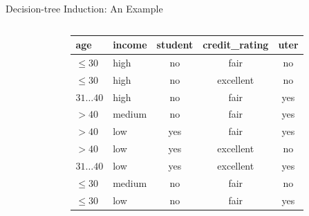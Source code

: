 \begin{frame}{Decision-tree Induction: An Example}
\begin{columns}
\begin{column}{0.4\textwidth}
\begin{itemize}
      \end{itemize}
    \end{column}
    \begin{column}{0.6\textwidth}
      \begin{tabular}{|l|l|c|c|c|}
        \hline
        \cellcolor{blue!20}age & \cellcolor{blue!20}income & \cellcolor{blue!20}student & \cellcolor{blue!20}credit\_rating & \cellcolor{blue!20}uter \\\hline
        \cellcolor{yellow!20}$\leq 30$ & \cellcolor{yellow!20}high & \cellcolor{yellow!20}no & \cellcolor{yellow!20}fair & \cellcolor{red!20}no \\\hline
        \cellcolor{yellow!20}$\leq 30$ & \cellcolor{yellow!20}high & \cellcolor{yellow!20}no & \cellcolor{yellow!20}excellent & \cellcolor{red!20}no \\\hline
        \cellcolor{yellow!20}$31\ldots40$ & \cellcolor{yellow!20}high & \cellcolor{yellow!20}no & \cellcolor{yellow!20}fair & \cellcolor{green!20}yes \\\hline
        \cellcolor{yellow!20}$>40$ & \cellcolor{yellow!20}medium & \cellcolor{yellow!20}no & \cellcolor{yellow!20}fair & \cellcolor{green!20}yes \\\hline
        \cellcolor{yellow!20}$>40$ & \cellcolor{yellow!20}low & \cellcolor{yellow!20}yes & \cellcolor{yellow!20}fair & \cellcolor{green!20}yes \\\hline
        \cellcolor{yellow!20}$>40$ & \cellcolor{yellow!20}low & \cellcolor{yellow!20}yes & \cellcolor{yellow!20}excellent & \cellcolor{red!20}no \\\hline
        \cellcolor{yellow!20}$31\ldots40$ & \cellcolor{yellow!20}low & \cellcolor{yellow!20}yes & \cellcolor{yellow!20}excellent & \cellcolor{green!20}yes \\\hline
        \cellcolor{yellow!20}$\leq 30$ & \cellcolor{yellow!20}medium & \cellcolor{yellow!20}no & \cellcolor{yellow!20}fair & \cellcolor{red!20}no \\\hline
        \cellcolor{yellow!20}$\leq 30$ & \cellcolor{yellow!20}low & \cellcolor{yellow!20}no & \cellcolor{yellow!20}fair & \cellcolor{green!20}yes \\\hline

\end{tabular}
\end{column}
\end{columns}
\end{frame}
